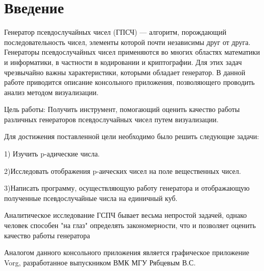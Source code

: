 \chapter*{Введение}							%
Генератор псевдослучайных чисел (ГПСЧ) — алгоритм, порождающий последовательность чисел, элементы которой почти независимы друг от друга.
Генераторы псевдослучайных чисел применяются во многих областях математики и информатики, в частности в кодировании и криптографии. Для этих задач чрезвычайно важны характеристики, которыми обладает генератор.
В данной работе приводится описание консольного приложения, позволяющего проводить анализ методом визуализации. 

Цель работы: Получить инструмент, помогающий оценить качество работы различных генераторов псевдослучайных чисел путем визуализации.

Для достижения поставленной цели необходимо было решить следующие задачи:

1) Изучить p-адические числа.

2)Исследовать отображения p-аических чисел на поле вещественных чисел.

3)Написать программу, осуществляющую работу генератора и отображающую полученные псевдослучайные числа на единичный куб.

Аналитическое исследование ГСПЧ бывает весьма непростой задачей, однако человек способен "на глаз" определять закономерности, что и позволяет оценить качество работы генератора 

Аналогом данного консольного приложения является графическое приложение Vorg, разработанное выпускником ВМК МГУ  Рябцевым В.С.

\clearpage
